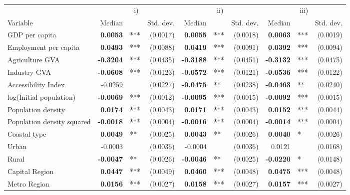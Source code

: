 \begin{table}[t]
\centering
\addtolength{\tabcolsep}{-0.6em}
\begin{tabular}{lrl@{~}r@{~~~~~}rl@{~}r@{~~~~~}rl@{~}r}
   \toprule
 \multicolumn{1}{c}{} & \multicolumn{3}{c}{i)} & \multicolumn{3}{c}{ii)} & \multicolumn{3}{c}{iii)} \\ 
 Variable & Median && Std. dev. & Median && Std. dev. & Median && Std. dev. \\ 
 \midrule
GDP per capita & \textbf{0.0053} & *** & (0.0017) & \textbf{0.0055} & *** & (0.0018) & \textbf{0.0063} & *** & (0.0019) \\ 
  Employment per capita & \textbf{0.0493} & *** & (0.0088) & \textbf{0.0419} & *** & (0.0091) & \textbf{0.0392} & *** & (0.0094) \\ 
  Agriculture GVA & \textbf{-0.3204} & *** & (0.0435) & \textbf{-0.3188} & *** & (0.0451) & \textbf{-0.3132} & *** & (0.0475) \\ 
  Industry GVA & \textbf{-0.0608} & *** & (0.0123) & \textbf{-0.0572} & *** & (0.0121) & \textbf{-0.0536} & *** & (0.0122) \\ 
  Accessibility Index & -0.0259 &  & (0.0227) & \textbf{-0.0475} & ** & (0.0238) & \textbf{-0.0463} & ** & (0.0240) \\ 
  log(Initial population) & \textbf{-0.0069} & *** & (0.0012) & \textbf{-0.0095} & *** & (0.0015) & \textbf{-0.0092} & *** & (0.0015) \\ 
  Population density & \textbf{0.0174} & *** & (0.0043) & \textbf{0.0171} & *** & (0.0043) & \textbf{0.0152} & *** & (0.0044) \\ 
  Population density squared & \textbf{-0.0018} & *** & (0.0004) & \textbf{-0.0016} & *** & (0.0004) & \textbf{-0.0014} & *** & (0.0004) \\ 
  Coastal type & \textbf{0.0049} & ** & (0.0025) & \textbf{0.0043} & ** & (0.0026) & \textbf{0.0040} & * & (0.0026) \\ 
  Urban & -0.0003 &  & (0.0036) & -0.0004 &  & (0.0036) & 0.0121 &  & (0.0168) \\ 
  Rural & \textbf{-0.0047} & ** & (0.0026) & \textbf{-0.0046} & ** & (0.0025) & \textbf{-0.0220} & * & (0.0148) \\ 
  Capital Region & \textbf{0.0447} & *** & (0.0049) & \textbf{0.0460} & *** & (0.0048) & \textbf{0.0475} & *** & (0.0048) \\ 
  Metro Region & \textbf{0.0156} & *** & (0.0027) & \textbf{0.0158} & *** & (0.0027) & \textbf{0.0157} & *** & (0.0027) \\ 

\end{tabular}
\end{table}
